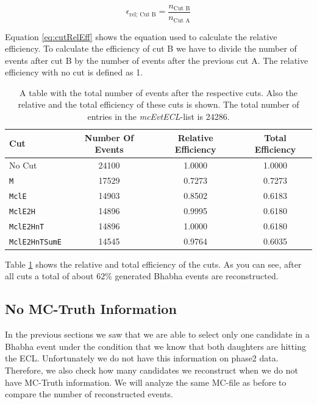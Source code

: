 \documentclass[a4paper,11pt,twosided,final,german,openbib,pdftex,listof=totoc,bibliography=totoc]{scrbook}
\begin{document}
\begin{equation}
	\epsilon_{\textrm{rel; Cut B}} = \frac{n_{\textrm{Cut B}}}{n_{\textrm{Cut A}}}
	\label{eq:cutRelEff}
\end{equation}

Equation \ref{eq:cutRelEff} shows the equation used to calculate the relative efficiency. To calculate the efficiency of cut B we have to divide the number of events after cut B by the number of events after the previous
cut A. The relative efficiency with no cut is defined as 1.

\begin{table}[h!]
	\centering
\begin{tabular}{lccc}
 Cut& Number Of Events&  Relative Efficiency& Total Efficiency\\
 \hline
 No Cut&24100 &1.0000 &1.0000 \\
 \texttt{M}& 17529&0.7273 &0.7273 \\
 \texttt{MclE}&14903 &0.8502 &0.6183 \\
 \texttt{MclE2H}&14896&0.9995  &0.6180 \\
 \texttt{MclE2HnT}&14896 &1.0000 &0.6180 \\
 \texttt{MclE2HnTSumE}& 14545 &0.9764 &0.6035 \\

\end{tabular}

\caption[Cut Efficiencies]{A table with the total number of events after the respective cuts. Also the relative and the total efficiency of these cuts is shown. The total number of entries in the \textit{mcEvtECL}-list is 24286.}
\label{tab:cutEff}
\end{table}

Table \ref{tab:cutEff} shows the relative and total efficiency of the cuts.
As you can see, after all cuts a total of about $62\%$ generated Bhabha events are reconstructed. 

\subsection{No MC-Truth Information}
\label{sec:NoMCT}

In the previous sections we saw that we are able to select only one candidate in a Bhabha event under the condition that we know that both daughters are hitting the ECL. Unfortunately we do not have this information on phase2 data. Therefore, we also check how many candidates we reconstruct when we do not have MC-Truth information. We will analyze the same MC-file as before to compare the number of reconstructed events. 
\end{document}
